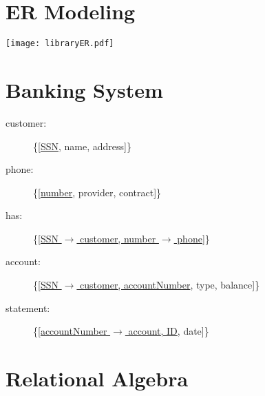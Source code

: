 \section{ER Modeling}

\def\arraystretch{1.25}

\begin{center}
\texttt{[image: libraryER.pdf]}
\end{center}

\section{Banking System}
\begin{description}
\item[customer:]{\{[\underline{SSN}, name, address]\}}
\item[phone:]{\{[\underline{number}, provider, contract]\}}
\item[has:]{\{[\underline{SSN $\rightarrow$ customer, number $\rightarrow$ phone}]\}}
\item[account:]{\{[\underline{SSN $\rightarrow$ customer, accountNumber}, type, balance]\}}
\item[statement:]{\{[\underline{accountNumber $\rightarrow$ account, ID}, date]\}}
\end{description}

\section{Relational Algebra}

\subsection{~}


